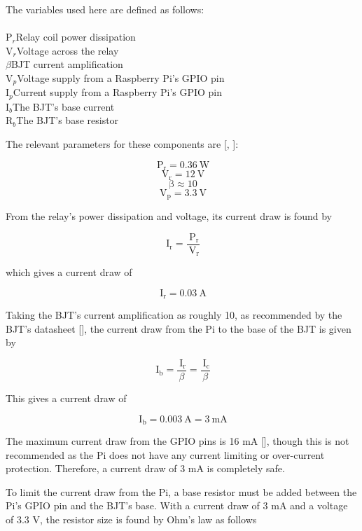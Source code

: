 \begin{minipage}{\textwidth}

The variables used here are defined as follows:
\\\\
P$_r$\dotfill Relay coil power dissipation\\
V$_r$\dotfill Voltage across the relay\\
$\beta$\dotfill BJT current amplification\\
V$_p$\dotfill Voltage supply from a Raspberry Pi's GPIO pin\\
I$_p$\dotfill Current supply from a Raspberry Pi's GPIO pin\\
I$_b$\dotfill The BJT's base current\\
R$_b$\dotfill The BJT's base resistor\\


\end{minipage}

The relevant  parameters for these components are [\cite{manual:relay-specs},
\cite{maunual:transistor-datasheet}]:

\[ \mathrm{\ P_{r}} = 0.36\mathrm{\ W}\]
\[ \mathrm{\ V_{r}} = 12\mathrm{\ V}\]
\[ \mathrm{\ \beta} \approx 10\]
\[ \mathrm{\ V_{p}} = 3.3\mathrm{\ V}\]

From the relay's power dissipation and voltage, its current draw is found by

\[
\mathrm{\ I_{r}} = \frac{\mathrm{\ P_{r}}}{\mathrm{\ V_{r}}}
\]

which gives a current draw of

\[
\mathrm{\ I_{r}} = 0.03\mathrm{\ A}
\]

Taking the BJT's current amplification as roughly 10, as recommended by the
BJT's datasheet [\cite{maunual:transistor-datasheet}], the current draw from the
Pi to the base of the BJT is given by

\[
\mathrm{\ I_{b}} = \frac{\mathrm{\ I_{r}}}{\beta} = \frac{\mathrm{\
I_{c}}}{\beta}
\]

This gives a current draw of

\[
\mathrm{\ I_{b}} = 0.003\mathrm{\ A} = 3\mathrm{\ mA}
\]

The maximum current draw from the GPIO pins is 16 mA
[\cite{website:gpio-specs}], though this is not recommended as the Pi does not
have any current limiting or over-current protection.
Therefore, a current draw of 3 mA is completely safe.

To limit the current draw from the Pi, a base resistor must be added between the Pi's GPIO pin
and the BJT's base. With a current draw of 3 mA and a voltage of 3.3 V, the
resistor size is found by Ohm's law as follows


